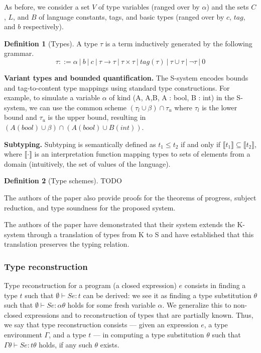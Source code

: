 \documentclass[a4paper,11pt,oneside]{article}
\theoremstyle{definition}
\newtheorem{defsec}{Definition}[section]
\begin{document}
As before, we consider a set $V$ of type variables (ranged over by $\alpha$)
and the sets $C$, $L$, and $B$ of language constants, tags, and
basic types (ranged over by $c$, $tag$, and $b$ respectively).

\begin{defsec}[Types]
  A type $\tau$ is a term inductively generated by the following grammar.
  $$ \tau ::= \alpha\ |\ b\ |\ c\ |\ \tau \rightarrow \tau\ |\ \tau \times \tau\ |\ tag(\tau)\ |\ \tau \cup \tau\ |\ \neg\tau\ |\ 0 $$
\end{defsec}

\textbf{Variant types and bounded quantification.}
The S-system encodes bounds and tag-to-content type mappings using standard
type constructions. For example, to simulate a variable $\alpha$ of kind
({A}, {A,B}, {A : bool, B : int}) in the S-system, we can use the common
scheme $(\tau_l \cup \beta) \cap \tau_u$ where $\tau_l$ is the lower bound
and $\tau_u$ is the upper bound, resulting in
$(A(bool) \cup \beta) \cap (A(bool) \cup B(int))$.

\textbf{Subtyping.}
Subtyping is semantically defined as $t_1 \leq t_2$ if and only if
$\llbracket t_1\rrbracket \subseteq \llbracket t_2\rrbracket$, where
$\llbracket\cdot\rrbracket$ is an interpretation function mapping types
to sets of elements from a domain
(intuitively, the set of values of the language).

\begin{defsec}[Type schemes]
  TODO
\end{defsec}

The authors of the paper also provide proofs for the theorems of
progress, subject reduction, and type soundness for the proposed system.

The authors of the paper have demonstrated that their system extends the K-system
through a translation of types from K to S and have established that this
translation preserves the typing relation.

\subsubsection{Type reconstruction}

Type reconstruction for a program (a closed expression) $e$ consists
in finding a type $t$ such that $\emptyset \vdash S e : t$ can be derived: we see it
as finding a type substitution $\theta$ such that $\emptyset \vdash S e : \alpha\theta$
holds for some fresh variable $\alpha$.
We generalize this to non-closed expressions and
to reconstruction of types that are partially known. Thus, we say
that type reconstruction consists — given an expression $e$, a type environment
$\Gamma$, and a type $t$ — in computing a type substitution $\theta$ such
that $\Gamma \theta \vdash S e : t\theta$ holds, if any such $\theta$ exists.
\end{document}
